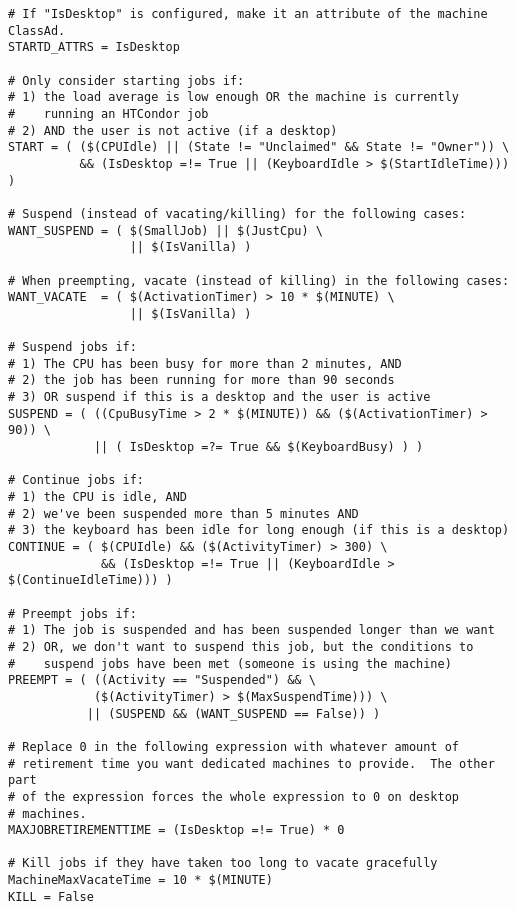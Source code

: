 \begin{verbatim}
# If "IsDesktop" is configured, make it an attribute of the machine ClassAd.
STARTD_ATTRS = IsDesktop

# Only consider starting jobs if:
# 1) the load average is low enough OR the machine is currently
#    running an HTCondor job
# 2) AND the user is not active (if a desktop)
START = ( ($(CPUIdle) || (State != "Unclaimed" && State != "Owner")) \
          && (IsDesktop =!= True || (KeyboardIdle > $(StartIdleTime))) )

# Suspend (instead of vacating/killing) for the following cases:
WANT_SUSPEND = ( $(SmallJob) || $(JustCpu) \
                 || $(IsVanilla) )

# When preempting, vacate (instead of killing) in the following cases:
WANT_VACATE  = ( $(ActivationTimer) > 10 * $(MINUTE) \
                 || $(IsVanilla) )

# Suspend jobs if:
# 1) The CPU has been busy for more than 2 minutes, AND
# 2) the job has been running for more than 90 seconds
# 3) OR suspend if this is a desktop and the user is active
SUSPEND = ( ((CpuBusyTime > 2 * $(MINUTE)) && ($(ActivationTimer) > 90)) \
            || ( IsDesktop =?= True && $(KeyboardBusy) ) )

# Continue jobs if:
# 1) the CPU is idle, AND 
# 2) we've been suspended more than 5 minutes AND
# 3) the keyboard has been idle for long enough (if this is a desktop)
CONTINUE = ( $(CPUIdle) && ($(ActivityTimer) > 300) \
             && (IsDesktop =!= True || (KeyboardIdle > $(ContinueIdleTime))) )

# Preempt jobs if:
# 1) The job is suspended and has been suspended longer than we want
# 2) OR, we don't want to suspend this job, but the conditions to
#    suspend jobs have been met (someone is using the machine)
PREEMPT = ( ((Activity == "Suspended") && \
            ($(ActivityTimer) > $(MaxSuspendTime))) \
           || (SUSPEND && (WANT_SUSPEND == False)) )

# Replace 0 in the following expression with whatever amount of
# retirement time you want dedicated machines to provide.  The other part
# of the expression forces the whole expression to 0 on desktop
# machines.
MAXJOBRETIREMENTTIME = (IsDesktop =!= True) * 0

# Kill jobs if they have taken too long to vacate gracefully
MachineMaxVacateTime = 10 * $(MINUTE)
KILL = False

\end{verbatim}


